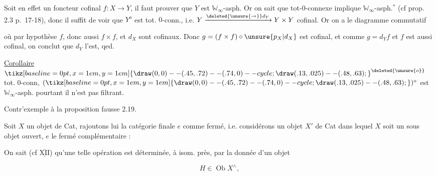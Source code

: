 Soit en effet un foncteur cofinal $f:X\to Y$, il faut prouver que $Y$ est $\mathbb W_\infty$-asph. Or on sait que tot-$0$-connexe implique $\mathbb W_\infty$-asph.$^*$ (cf prop. 2.3 p.~17-18), donc il suffit de voir que $Y^o$ est tot. $0$-conn., i.e. $Y\xrightarrow{\deleted{\unsure{\to}}d_Y}Y\times Y$ cofinal. Or on a le diagramme commutatif

\reversemarginpar{}\normalmarginpar


où par hypothèse $f$, donc aussi $f\times f$, et $d_X$ sont cofinaux. Donc $g=(f\times f)\circ\unsure{p_X|d_X}$ est cofinal, et comme $g=d_Yf$ et $f$ est aussi cofinal, on conclut que $d_Y$ l'est, qed.

\uline{Corollaire} $\mathord{\tikz[baseline=0pt,x=1em,y=1em]{\draw (0,0)--(.45,.72)--(.74,0)--cycle; \draw (.13,.025)--(.48,.63);}}^{\deleted{\unsure{o}}}$  tot. $0$-conn, $(\mathord{\tikz[baseline=0pt,x=1em,y=1em]{\draw (0,0)--(.45,.72)--(.74,0)--cycle; \draw (.13,.025)--(.48,.63);}})^o$ est  $\mathbb W_\infty$-asph. pourtant il n'est pas filtrant.



 Contr'exemple à la proposition fausse 2.19.

Soit $X$ un objet de Cat, rajoutons lui  la catégorie finale $e$ comme fermé, i.e. considérons un objet $X'$ de Cat dans lequel $X$ soit un sous objet ouvert, $e$ le fermé complémentaire :


On sait (cf $\underline{\overline{\mathrm{XII}}}$) qu'une telle opération est déterminée, à isom. près, par la donnée d'un objet

\[
H\in\operatorname{Ob}X^\wedge,
\]

